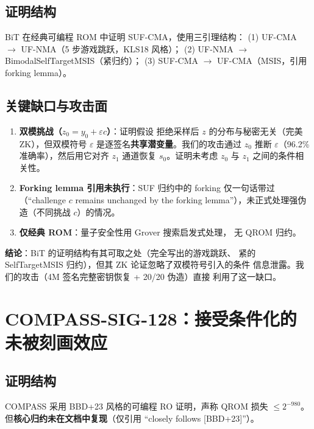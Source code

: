 \documentclass[11pt,a4paper]{ctexart}
\begin{document}
\subsection{证明结构}

BiT 在经典可编程 ROM 中证明 SUF-CMA，使用三引理结构：
(1) UF-CMA $\to$ UF-NMA（5 步游戏跳跃，KLS18 风格）；
(2) UF-NMA $\to$ BimodalSelfTargetMSIS（紧归约）；
(3) SUF-CMA $\to$ UF-CMA（MSIS，引用 forking lemma）。

\subsection{关键缺口与攻击面}

\begin{gapbox}
\begin{enumerate}
  \item \textbf{双模挑战（$z_0 = y_0 + \varepsilon c$）}：证明假设
        拒绝采样后 $z$ 的分布与秘密无关（完美 ZK），但双模符号
        $\varepsilon$ 是逐签名\textbf{共享潜变量}。我们的攻击通过
        $z_0$ 推断 $\varepsilon$（96.2\% 准确率），然后用它对齐 $z_1$
        通道恢复 $s_0$。证明未考虑 $z_0$ 与 $z_1$ 之间的条件相关性。
  \item \textbf{Forking lemma 引用未执行}：SUF 归约中的 forking
        仅一句话带过（``challenge $c$ remains unchanged by the
        forking lemma''），未正式处理强伪造（不同挑战 $c$）的情况。
  \item \textbf{仅经典 ROM}：量子安全性用 Grover 搜索启发式处理，
        无 QROM 归约。
\end{enumerate}
\end{gapbox}

\textbf{结论}：BiT 的证明结构有其可取之处（完全写出的游戏跳跃、
紧的 SelfTargetMSIS 归约），但其 ZK 论证忽略了双模符号引入的条件
信息泄露。我们的攻击（4M 签名完整密钥恢复 + 20/20 伪造）直接
利用了这一缺口。

\section{COMPASS-SIG-128：接受条件化的未被刻画效应}

\subsection{证明结构}

COMPASS 采用 BBD+23 风格的可编程 RO 证明，声称 QROM 损失 $\le 2^{-980}$。
但\textbf{核心归约未在文档中复现}（仅引用 ``closely follows [BBD+23]''）。
\end{document}
